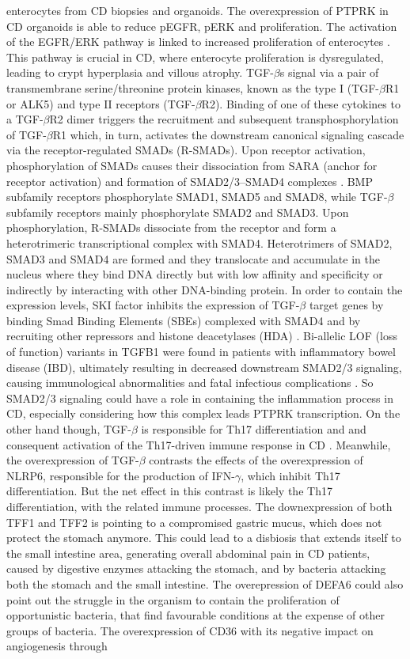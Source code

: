 \documentclass[12pt]{article}
\begin{document}
enterocytes from CD biopsies and organoids. The overexpression of PTPRK in CD organoids is able to reduce pEGFR, pERK and proliferation. The activation of the EGFR/ERK pathway is linked to increased proliferation of enterocytes \supercite{nanayakkara2022ptprk}. This pathway is crucial in CD, where enterocyte proliferation is dysregulated, leading to crypt hyperplasia and villous atrophy. TGF-$\beta$s signal via a pair of transmembrane serine/threonine protein kinases, known as the type I (TGF-$\beta$R1 or ALK5) and type II receptors (TGF-$\beta$R2). Binding of one of these cytokines to a TGF-$\beta$R2 dimer triggers the recruitment and subsequent transphosphorylation of TGF-$\beta$R1 which, in turn, activates the downstream canonical signaling cascade via the receptor-regulated SMADs (R-SMADs). Upon receptor activation, phosphorylation of SMADs causes their dissociation from SARA (anchor for receptor activation) and formation of SMAD2/3–SMAD4 complexes \supercite{tsukazaki1998sara}. BMP subfamily receptors phosphorylate SMAD1, SMAD5 and SMAD8, while TGF-$\beta$ subfamily receptors mainly phosphorylate SMAD2 and SMAD3. Upon phosphorylation, R-SMADs dissociate from the receptor and form a heterotrimeric transcriptional complex with SMAD4. Heterotrimers of SMAD2, SMAD3 and SMAD4 are formed and they translocate and accumulate in the nucleus where they bind DNA directly but with low affinity and specificity or indirectly by interacting with other DNA-binding protein. In order to contain the expression levels, SKI factor inhibits the expression of TGF-$\beta$ target genes by binding Smad Binding Elements (SBEs) complexed with SMAD4 and by recruiting other repressors and histone deacetylases (HDA) \supercite{tecalco2018transcriptional}. Bi-allelic LOF (loss of function) variants in TGFB1 were found in patients with inflammatory bowel disease (IBD), ultimately resulting in decreased downstream SMAD2/3 signaling, causing immunological abnormalities and fatal infectious complications \supercite{kotlarz2018human}. So SMAD2/3 signaling could have a role in containing the inflammation process in CD, especially considering how this complex leads PTPRK transcription. On the other hand though, TGF-$\beta$ is responsible for Th17 differentiation and and consequent activation of the Th17-driven immune response in CD \supercite{serena2017proinflammatory}.  Meanwhile, the overexpression of TGF-$\beta$ contrasts the effects of the overexpression of NLRP6, responsible for the production of IFN-$\gamma$, which inhibit Th17 differentiation. But the net effect in this contrast is likely the Th17 differentiation, with the related immune processes. The downexpression of both TFF1 and TFF2 is pointing to a compromised gastric mucus, which does not protect the stomach anymore. This could lead to a disbiosis that extends itself to the small intestine area, generating overall abdominal pain in CD patients, caused by digestive enzymes attacking the stomach, and by bacteria attacking both the stomach and the small intestine. The overepression of DEFA6 could also point out the struggle in the organism to contain the proliferation of opportunistic bacteria, that find favourable conditions at the expense of other groups of bacteria. The overexpression of CD36 with its negative impact on angiogenesis through 
\end{document}
